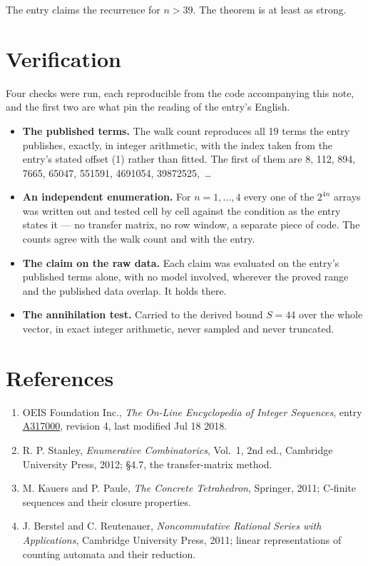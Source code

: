 \documentclass[11pt]{article}
\theoremstyle{definition}
\begin{document}
The entry claims the recurrence for $n > 39$. The theorem is at least as strong.

\section{Verification}

Four checks were run, each reproducible from the code accompanying this note, and the first two are what pin the reading of the entry's English.

\begin{itemize}

\item {\bfseries The published terms.} The walk count reproduces all 19 terms the entry publishes, exactly, in integer arithmetic, with the index taken from the entry's stated offset (1) rather than fitted. The first of them are 8, 112, 894, 7665, 65047, 551591, 4691054, 39872525,~\dots

\item {\bfseries An independent enumeration.} For $n = 1,\dots,4$ every one of the $2^{4n}$ arrays was written out and tested cell by cell against the condition as the entry states it --- no transfer matrix, no row window, a separate piece of code. The counts agree with the walk count and with the entry.

\item {\bfseries The claim on the raw data.} Each claim was evaluated on the entry's published terms alone, with no model involved, wherever the proved range and the published data overlap. It holds there.

\item {\bfseries The annihilation test.} Carried to the derived bound $S = 44$ over the whole vector, in exact integer arithmetic, never sampled and never truncated.

\end{itemize}

\section{References}

\begin{enumerate}

\item OEIS Foundation Inc., \emph{The On-Line Encyclopedia of Integer Sequences}, entry \href{https://oeis.org/A317000}{A317000}, revision 4, last modified Jul 18 2018.

\item R. P. Stanley, \emph{Enumerative Combinatorics}, Vol.~1, 2nd ed., Cambridge University Press, 2012; \S4.7, the transfer-matrix method.

\item M. Kauers and P. Paule, \emph{The Concrete Tetrahedron}, Springer, 2011; C-finite sequences and their closure properties.

\item J. Berstel and C. Reutenauer, \emph{Noncommutative Rational Series with Applications}, Cambridge University Press, 2011; linear representations of counting automata and their reduction.

\end{enumerate}
\end{document}
